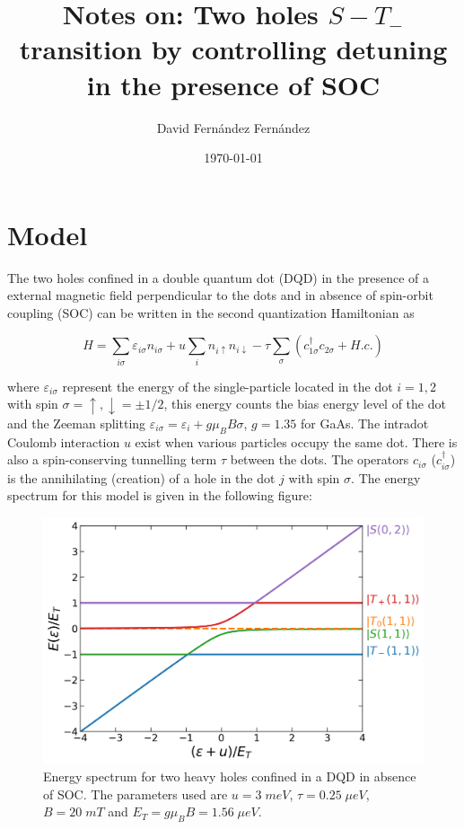 \documentclass[aip,rsi,amsmath,amssymb,reprint, english]{revtex4-1}
\begin{document}
	
\title{Notes on: Two holes $S-T_-$ transition by controlling detuning in the presence of SOC}
\author{David Fernández Fernández}
\date{\today}

\maketitle

\section{Model} \label{sec:Model}
The two holes confined in a double quantum dot (DQD) in the presence of a external magnetic field perpendicular to the dots and in absence of spin-orbit coupling (SOC) can be written in the second quantization Hamiltonian as

\begin{equation}
	H=\sum_{i\sigma}\varepsilon_{i\sigma}n_{i\sigma}+u\sum_in_{i\uparrow}n_{i\downarrow}-\tau\sum_{\sigma}\left(c_{1\sigma}^{\dagger}c_{2\sigma}+H.c.\right)
\end{equation}

where $\varepsilon_{i\sigma}$ represent the energy of the single-particle located in the dot $i=1,2$ with spin $\sigma=\uparrow,\downarrow=\pm1/2$, this energy counts the bias energy level of the dot and the Zeeman splitting $\varepsilon_{i\sigma}=\varepsilon_{i}+g\mu_BB\sigma$, $g=1.35$ for GaAs. The intradot Coulomb interaction $u$ exist when various particles occupy the same dot. There is also a spin-conserving tunnelling term $\tau$ between the dots. The operators $c_{i\sigma}$ ($c^{\dagger}_{i\sigma}$) is the annihilating (creation) of a hole in the dot $j$ with spin $\sigma$. The energy spectrum for this model is given in the following figure: 

\begin{figure}[h!]
	\centering
	\includegraphics[width=\linewidth]{spectrum_5_levels_woSOC}
	\caption{Energy spectrum for two heavy holes confined in a DQD in absence of SOC. The parameters used are $u=3\; meV$, $\tau=0.25 \; \mu eV$, $B=20\; mT$ and $E_T=g\mu_B B=1.56 \; \mu eV$.}
	\label{fig:spectrum_1}
\end{figure}
\end{document}
